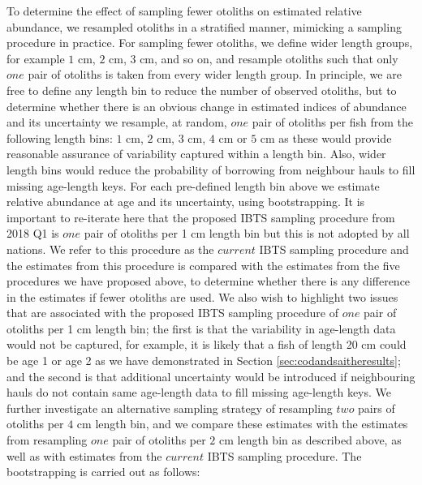 \documentclass[a4paper 12pt]{article}
\numberwithin{equation}{section}
\begin{document}
To determine the effect of sampling fewer otoliths on estimated relative abundance, we resampled otoliths in a stratified manner, mimicking a sampling procedure in practice. For sampling fewer otoliths, we define wider length groups, for example $1$ cm, $2$ cm, $3$ cm, and so on,  and resample otoliths  such that only $one$ pair of otoliths is taken from every wider length group.  In principle, we are free to define any length bin to reduce the number of observed otoliths, but to determine whether there is an obvious change in estimated indices of abundance and its uncertainty we resample, at random, $one$ pair of otoliths per fish from the following length bins: $1$ cm, $2$ cm, $3$ cm, $4$ cm or $5$ cm as these would provide reasonable assurance of variability captured within a length bin. Also, wider length bins would reduce the probability of borrowing from neighbour hauls to fill missing age-length keys. For each pre-defined length bin above we estimate relative abundance at age and its uncertainty, using bootstrapping. It is important to re-iterate here that the proposed IBTS sampling procedure from 2018 Q1 is $one$ pair of otoliths per 1 cm length bin but this is not adopted by all nations. We refer to this procedure as the $current$ IBTS sampling procedure and the estimates from this procedure is compared with the estimates from the five procedures we have proposed above, to determine whether there is any difference in the estimates if fewer otoliths are used. We also wish to highlight two issues that are associated with the proposed IBTS sampling procedure of $one$ pair of otoliths per 1 cm length bin; the first is that the variability in age-length data would not be captured,  for example, it is likely that a fish of length 20 cm could be age 1 or age 2 as we have demonstrated in Section \ref{sec:codandsaitheresults}; and the second is that additional uncertainty would be introduced if neighbouring hauls do not contain same age-length data to fill missing age-length keys. We further investigate an alternative sampling strategy of resampling $two$ pairs of otoliths per $4$ cm length bin, and we compare these estimates with the estimates from resampling $one$ pair of otoliths per $2$ cm length bin as described above, as well as with estimates from the $current$ IBTS sampling procedure. The bootstrapping is carried out as follows: 
\end{document}
